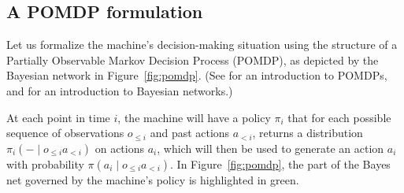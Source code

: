 \documentclass{article}
\newcommand{\hist}[1]{o_{\le #1}a_{<#1}}
\newcommand{\fig}[1]{Figure~\ref{fig:#1}}
\begin{document}
\subsection{A POMDP formulation}

Let us formalize the machine's decision-making situation using the structure of a Partially Observable Markov Decision Process (POMDP), as depicted by the Bayesian network in \fig{pomdp}.  (See \citet{russell2003artificial} for an introduction to POMDPs, and \citet{darwiche2009modeling} for an introduction to Bayesian networks.)

At each point in time $i$, the machine will have a policy $\pi_i$ that for each possible sequence of observations $o_{\le i}$ and past actions $a_{<i}$, returns a distribution $\pi_i(- \mid \hist i)$ on actions $a_i$, which will then be used to generate an action $a_i$ with probability $\pi(a_i \mid \hist i)$.  In \fig{pomdp}, the part of the Bayes net governed by the machine's policy is highlighted in green.

\begin{figure*}
\begin{center}
\end{center}
\caption{A POMDP of length $n=\lenn$}
\label{fig:pomdp}
\end{figure*}
\end{document}
